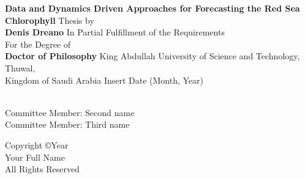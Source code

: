 \documentclass[onecolumn, 12 pt, doublespace, fullpage, letterpaper, twoside, openright]{report}
\begin{document}

\vspace{2pt}
\thispagestyle{empty}
\addvspace{10mm}

\begin{center}
{\bf\Large Data and Dynamics Driven Approaches for Forecasting the Red Sea Chlorophyll}\vfill
{\Large Thesis by}\\
{\bf\Large Denis Dreano}\vfill
{\Large In Partial Fulfillment of the Requirements}\\[12pt]
{\Large For the Degree of}\\[12pt]
{\bf\Large Doctor of Philosophy} \vfill
{King Abdullah University of Science and Technology, Thuwal,}\\
{Kingdom of Saudi Arabia}
\vfill
{Insert Date (Month, Year)}\vfill

\end{center}

\newpage
{}

\vspace{6\baselineskip}

\\
Committee Member: Second name\\
Committee Member: Third name\vfill


\newpage
\vspace*{\fill}
\begin{center}
{Copyright \copyright Year}\\
{Your Full Name}\\
{All Rights Reserved}
\end{center}
\end{document}
